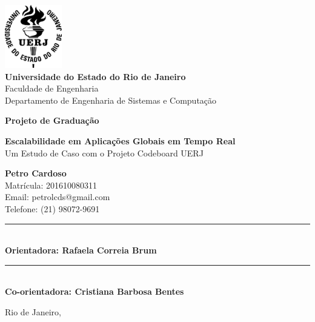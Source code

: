 \begin{titlepage}
    \begin{center}
        \includegraphics[width=2.5cm]{assets/uerj_logo.png}\\
        \vspace{0.5cm}
        \large \textbf{Universidade do Estado do Rio de Janeiro}\\
        \normalsize Faculdade de Engenharia\\
        \normalsize Departamento de Engenharia de Sistemas e Computação
        
        \vspace{2.5cm}
        
        \textbf{\Large Projeto de Graduação}
        
        \vfill
        \Large\textbf{Escalabilidade em Aplicações Globais em Tempo Real}\\
        \Large{Um Estudo de Caso com o Projeto Codeboard UERJ}
        \vfill
        
        \normalsize\textbf{Petro Cardoso}\\
        \normalsize{Matrícula: 201610080311}\\
        \normalsize{Email: petrolcds@gmail.com}\\
        \normalsize{Telefone: (21) 98072-9691}
        
        \vspace{2cm}
        
        \rule{8cm}{0.4pt}\\
        \normalsize\textbf{Orientadora: Rafaela Correia Brum}\\
        
        \vspace{1cm}
        
        \rule{8cm}{0.4pt}\\
        \normalsize\textbf{Co-orientadora: Cristiana Barbosa Bentes}
        
        \vfill
        
        \normalsize Rio de Janeiro, \the\year
    \end{center}
\end{titlepage}